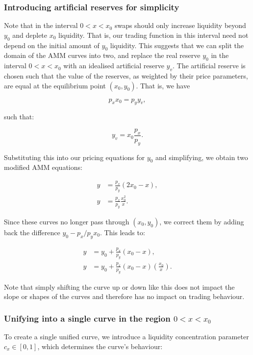 \documentclass{article}
\begin{document}
\subsubsection{Introducing artificial reserves for simplicity}

Note that in the interval $0 < x < x_0$ swaps should only increase liquidity beyond $y_0$ and deplete $x_0$ liquidity. That is, our trading function in this interval need not depend on the initial amount of $y_0$ liquidity. This suggests that we can split the domain of the AMM curves into two, and replace the real reserve $y_0$ in the interval $0 < x < x_0$ with an idealised artificial reserve $y_v$. The artificial reserve is chosen such that the value of the reserves, as weighted by their price parameters, are equal at the equilibrium point $(x_0, y_0)$. That is, we have

\[
p_x x_0 = p_y y_v,
\]

such that:

\[
y_v = x_0 \frac{p_x}{p_y}.
\]

Substituting this into our pricing equations for $y_0$ and simplifying, we obtain two modified AMM equations:

\begin{align}
    y &= \frac{p_x}{p_y} (2x_0 - x), \\
    y &= \frac{p_x}{p_y} \frac{x_0^2}{x}.
\end{align}

Since these curves no longer pass through \( (x_0, y_0) \), we correct them by adding back the difference \( y_0 - p_x / p_y x_0 \). This leads to:

\begin{align}
    y &= y_0 + \frac{p_x}{p_y} (x_0 - x), \\
    y &= y_0 + \frac{p_x}{p_y} (x_0 - x) \left( \frac{x_0}{x} \right).
\end{align}

Note that simply shifting the curve up or down like this does not impact the slope or shapes of the curves and therefore has no impact on trading behaviour.

\subsubsection{Unifying into a single curve in the region $0 < x < x_0$}

To create a single unified curve, we introduce a liquidity concentration parameter \( c_x \in [0, 1] \), which determines the curve’s behaviour:
\end{document}
